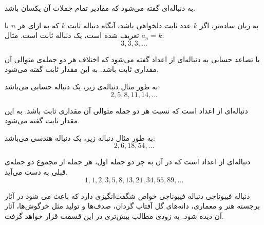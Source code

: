 
\begin{DEFINITION}
  \p
  به دنباله‌ای گفته می‌شود که مقادیر تمام جملات آن یکسان باشد.
\end{DEFINITION}

\p
به زبان ساده‌تر، اگر
$k$
عدد ثابت دلخواهی باشد، آنگاه دنباله ثابت 
$k$
که به ازای هر 
$n$
با 
$a_n = k$
تعریف شده است، 
یک دنباله ثابت است.
مثال:
$$3, 3, 3, ...$$

\begin{DEFINITION}
    \p
    یا تصاعد حسابی به دنباله‌ای از اعداد گفته می‌شود که اختلاف هر دو جمله‌ی متوالی آن مقداری ثابت باشد. به این مقدار ثابت 
      گفته می‌شود.
\end{DEFINITION}
	\p
به طور مثال دنباله‌ی زیر، یک دنباله‌ حسابی می‌باشد:
$$2, 5, 8, 11, 14, ...$$





\begin{DEFINITION}
    \p
   دنباله‌ای از اعداد است که نسبت هر دو جمله متوالی آن مقداری ثابت باشد. به این مقدار ثابت 
  گفته می‌شود.    
\end{DEFINITION}
	\p
به طور مثال دنباله زیر، یک دنباله هندسی می‌باشد:
$$2, 6, 18, 54, ...$$




\begin{DEFINITION}
    \p
    دنباله‌ای از اعداد است که در آن به جز دو جمله اول، هر جمله از مجموع دو جمله‌ی قبلی به دست می‌آید.
    \p
  $$1, 1, 2, 3, 5, 8, 13, 21, 34, 55, 89, ...$$
	\p 
\end{DEFINITION}

\begin{EXTRA}{دنباله فیبوناچی}
  \p
دنباله فیبوناچی خواص شگفت‌انگیزی دارد که باعث می شود در آثار برجسته هنر و معماری، دانه‌های گل آفتاب گردان، صدف‌ها و تولید مثل خرگوش‌ها، آثار آن دیده شود. به زودی مطالب بیش‌تری در این قسمت قرار خواهد گرفت.
\end{EXTRA}


